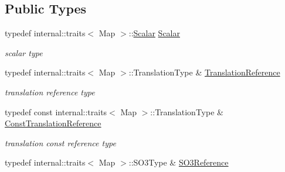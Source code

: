 \subsection*{Public Types}
\begin{DoxyCompactItemize}
\item 
typedef internal\+::traits$<$ Map $>$\+::\hyperlink{class_eigen_1_1_map_3_01_sophus_1_1_s_e3_group_3_01___scalar_01_4_00_01___options_01_4_a09d0d1676e19353b9b474da1e5e9df2c}{Scalar} \hyperlink{class_eigen_1_1_map_3_01_sophus_1_1_s_e3_group_3_01___scalar_01_4_00_01___options_01_4_a09d0d1676e19353b9b474da1e5e9df2c}{Scalar}\hypertarget{class_eigen_1_1_map_3_01_sophus_1_1_s_e3_group_3_01___scalar_01_4_00_01___options_01_4_a09d0d1676e19353b9b474da1e5e9df2c}{}\label{class_eigen_1_1_map_3_01_sophus_1_1_s_e3_group_3_01___scalar_01_4_00_01___options_01_4_a09d0d1676e19353b9b474da1e5e9df2c}

\begin{DoxyCompactList}\small\item\em scalar type \end{DoxyCompactList}\item 
typedef internal\+::traits$<$ Map $>$\+::Translation\+Type \& \hyperlink{class_eigen_1_1_map_3_01_sophus_1_1_s_e3_group_3_01___scalar_01_4_00_01___options_01_4_a02744f35b5be16827bff99971a171e02}{Translation\+Reference}\hypertarget{class_eigen_1_1_map_3_01_sophus_1_1_s_e3_group_3_01___scalar_01_4_00_01___options_01_4_a02744f35b5be16827bff99971a171e02}{}\label{class_eigen_1_1_map_3_01_sophus_1_1_s_e3_group_3_01___scalar_01_4_00_01___options_01_4_a02744f35b5be16827bff99971a171e02}

\begin{DoxyCompactList}\small\item\em translation reference type \end{DoxyCompactList}\item 
typedef const internal\+::traits$<$ Map $>$\+::Translation\+Type \& \hyperlink{class_eigen_1_1_map_3_01_sophus_1_1_s_e3_group_3_01___scalar_01_4_00_01___options_01_4_af4ec7e66b89c09a78c6290b0f3fbd747}{Const\+Translation\+Reference}\hypertarget{class_eigen_1_1_map_3_01_sophus_1_1_s_e3_group_3_01___scalar_01_4_00_01___options_01_4_af4ec7e66b89c09a78c6290b0f3fbd747}{}\label{class_eigen_1_1_map_3_01_sophus_1_1_s_e3_group_3_01___scalar_01_4_00_01___options_01_4_af4ec7e66b89c09a78c6290b0f3fbd747}

\begin{DoxyCompactList}\small\item\em translation const reference type \end{DoxyCompactList}\item 
typedef internal\+::traits$<$ Map $>$\+::S\+O3\+Type \& \hyperlink{class_eigen_1_1_map_3_01_sophus_1_1_s_e3_group_3_01___scalar_01_4_00_01___options_01_4_a8847044218603f949618d62e714481e0}{S\+O3\+Reference}\hypertarget{class_eigen_1_1_map_3_01_sophus_1_1_s_e3_group_3_01___scalar_01_4_00_01___options_01_4_a8847044218603f949618d62e714481e0}{}\label{class_eigen_1_1_map_3_01_sophus_1_1_s_e3_group_3_01___scalar_01_4_00_01___options_01_4_a8847044218603f949618d62e714481e0}


\end{DoxyCompactItemize}
